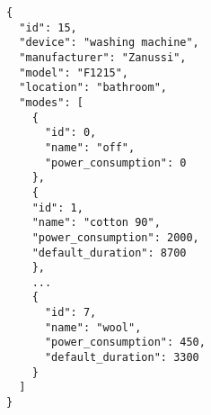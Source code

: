 \begin{lstlisting}[language=numbered,caption={JSON file describing the washing machine},label=code:appliance_washing_machine,float,floatplacement=H]
{
  "id": 15,
  "device": "washing machine",
  "manufacturer": "Zanussi",
  "model": "F1215",
  "location": "bathroom",
  "modes": [
    {
      "id": 0,
      "name": "off",
      "power_consumption": 0
    },
    {
    "id": 1,
    "name": "cotton 90",
    "power_consumption": 2000,
    "default_duration": 8700
    },
    ...	
    {
      "id": 7,
      "name": "wool",
      "power_consumption": 450,
      "default_duration": 3300
    }
  ]
}
\end{lstlisting}